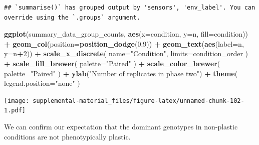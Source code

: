 \documentclass[]{book}
\newenvironment{Shaded}{\begin{snugshade}}{\end{snugshade}}
\newcommand{\DataTypeTok}[1]{\textcolor[rgb]{0.13,0.29,0.53}{#1}}
\newcommand{\DecValTok}[1]{\textcolor[rgb]{0.00,0.00,0.81}{#1}}
\newcommand{\FloatTok}[1]{\textcolor[rgb]{0.00,0.00,0.81}{#1}}
\newcommand{\KeywordTok}[1]{\textcolor[rgb]{0.13,0.29,0.53}{\textbf{#1}}}
\newcommand{\NormalTok}[1]{#1}
\newcommand{\OperatorTok}[1]{\textcolor[rgb]{0.81,0.36,0.00}{\textbf{#1}}}
\newcommand{\StringTok}[1]{\textcolor[rgb]{0.31,0.60,0.02}{#1}}
\begin{document}
\begin{verbatim}
## `summarise()` has grouped output by 'sensors', 'env_label'. You can override using the `.groups` argument.
\end{verbatim}

\begin{Shaded}
\begin{Highlighting}[]
\KeywordTok{ggplot}\NormalTok{(summary_data_group_counts, }\KeywordTok{aes}\NormalTok{(}\DataTypeTok{x=}\NormalTok{condition, }\DataTypeTok{y=}\NormalTok{n, }\DataTypeTok{fill=}\NormalTok{condition)) }\OperatorTok{+}
\StringTok{  }\KeywordTok{geom_col}\NormalTok{(}\DataTypeTok{position=}\KeywordTok{position_dodge}\NormalTok{(}\FloatTok{0.9}\NormalTok{)) }\OperatorTok{+}
\StringTok{  }\KeywordTok{geom_text}\NormalTok{(}\KeywordTok{aes}\NormalTok{(}\DataTypeTok{label=}\NormalTok{n, }\DataTypeTok{y=}\NormalTok{n}\OperatorTok{+}\DecValTok{2}\NormalTok{)) }\OperatorTok{+}
\StringTok{  }\KeywordTok{scale_x_discrete}\NormalTok{(}
    \DataTypeTok{name=}\StringTok{"Condition"}\NormalTok{,}
    \DataTypeTok{limits=}\NormalTok{condition_order}
\NormalTok{  ) }\OperatorTok{+}
\StringTok{  }\KeywordTok{scale_fill_brewer}\NormalTok{(}
    \DataTypeTok{palette=}\StringTok{"Paired"}
\NormalTok{  ) }\OperatorTok{+}
\StringTok{  }\KeywordTok{scale_color_brewer}\NormalTok{(}
    \DataTypeTok{palette=}\StringTok{"Paired"}
\NormalTok{  ) }\OperatorTok{+}
\StringTok{  }\KeywordTok{ylab}\NormalTok{(}\StringTok{"Number of replicates in phase two"}\NormalTok{) }\OperatorTok{+}
\StringTok{  }\KeywordTok{theme}\NormalTok{(}
    \DataTypeTok{legend.position=}\StringTok{"none"}
\NormalTok{  )}
\end{Highlighting}
\end{Shaded}

\texttt{[image: supplemental-material\_files/figure-latex/unnamed-chunk-102-1.pdf]}

We can confirm our expectation that the dominant genotypes in non-plastic conditions are not phenotypically plastic.
\end{document}
